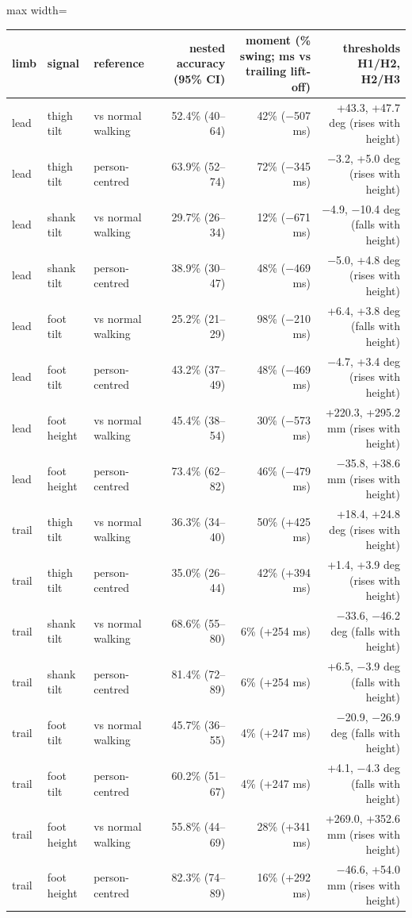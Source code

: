 \begin{adjustbox}{max width=\textwidth}
{\scriptsize
\begin{tabular}{lllrrr}
\toprule
\textbf{limb} & \textbf{signal} & \textbf{reference} & \textbf{nested accuracy (95\% CI)} & \textbf{moment (\% swing; ms vs trailing lift-off)} & \textbf{thresholds H1/H2, H2/H3} \\
\midrule
lead & thigh tilt & vs normal walking & 52.4\% (40--64) & 42\% ($-$507 ms) & +43.3, +47.7 deg (rises with height) \\
lead & thigh tilt & person-centred & 63.9\% (52--74) & 72\% ($-$345 ms) & $-$3.2, +5.0 deg (rises with height) \\
lead & shank tilt & vs normal walking & 29.7\% (26--34) & 12\% ($-$671 ms) & $-$4.9, $-$10.4 deg (falls with height) \\
lead & shank tilt & person-centred & 38.9\% (30--47) & 48\% ($-$469 ms) & $-$5.0, +4.8 deg (rises with height) \\
lead & foot tilt & vs normal walking & 25.2\% (21--29) & 98\% ($-$210 ms) & +6.4, +3.8 deg (falls with height) \\
lead & foot tilt & person-centred & 43.2\% (37--49) & 48\% ($-$469 ms) & $-$4.7, +3.4 deg (rises with height) \\
lead & foot height & vs normal walking & 45.4\% (38--54) & 30\% ($-$573 ms) & +220.3, +295.2 mm (rises with height) \\
lead & foot height & person-centred & 73.4\% (62--82) & 46\% ($-$479 ms) & $-$35.8, +38.6 mm (rises with height) \\
trail & thigh tilt & vs normal walking & 36.3\% (34--40) & 50\% (+425 ms) & +18.4, +24.8 deg (rises with height) \\
trail & thigh tilt & person-centred & 35.0\% (26--44) & 42\% (+394 ms) & +1.4, +3.9 deg (rises with height) \\
trail & shank tilt & vs normal walking & 68.6\% (55--80) & 6\% (+254 ms) & $-$33.6, $-$46.2 deg (falls with height) \\
trail & shank tilt & person-centred & 81.4\% (72--89) & 6\% (+254 ms) & +6.5, $-$3.9 deg (falls with height) \\
trail & foot tilt & vs normal walking & 45.7\% (36--55) & 4\% (+247 ms) & $-$20.9, $-$26.9 deg (falls with height) \\
trail & foot tilt & person-centred & 60.2\% (51--67) & 4\% (+247 ms) & +4.1, $-$4.3 deg (falls with height) \\
trail & foot height & vs normal walking & 55.8\% (44--69) & 28\% (+341 ms) & +269.0, +352.6 mm (rises with height) \\
trail & foot height & person-centred & 82.3\% (74--89) & 16\% (+292 ms) & $-$46.6, +54.0 mm (rises with height) \\
\bottomrule
\end{tabular}
}
\end{adjustbox}

